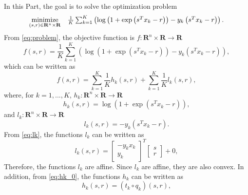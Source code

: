 \documentclass[12pt]{article}
\begin{document}
In this Part, the goal is to solve the optimization problem
\begin{equation} \label{eq:problem}
    \begin{array}[t]{ll} 
        \underset{(s,r) \in \mathbf{R}^n \times \mathbf{R}}{\text{minimize}} & \frac{1}{K} \sum_{k=1}^{K} \left(\log \left (1+\exp \left (s^T x_k - r\right) \right) - y_k \left (s^T x_k - r\right)  \right).\\
    \end{array} 
\end{equation}
From \eqref{eq:problem}, the objective function is $f: {\mathbf R}^n \times {\mathbf R} \rightarrow {\mathbf R}$
\begin{equation} \label{eq:objective_function_task_1}
    f(s,r) = \frac{1}{K} \sum_{k=1}^{K} \left(\log \left (1+\exp \left (s^T x_k - r\right) \right) - y_k \left (s^T x_k - r\right)  \right),
\end{equation}
which can be written as
\begin{equation} \label{eq:hk_lk_decomposition}
    f(s,r) = \sum_{k=1}^{K} \frac{1}{K} h_k(s,r) + \sum_{k=1}^{K} \frac{1}{K} l_k(s,r),
\end{equation}
where, for $k=1,...,K$, $h_k:{\mathbf R}^n \times {\mathbf R} \rightarrow {\mathbf R}$
\begin{equation} \label{eq:hk_0}
    h_k(s,r)=\log \left(1+\exp \left(s^T x_k - r\right)\right),
\end{equation}
and $l_k:{\mathbf R}^n \times {\mathbf R} \rightarrow {\mathbf R}$
\begin{equation} \label{eq:lk}
    l_k(s,r)=-y_k \left (s^T x_k - r\right).
\end{equation}
From \eqref{eq:lk}, the functions $l_k$ can be written as
\begin{equation}
    l_k(s,r) = \begin{bmatrix}
        -y_k x_k \\
        y_k
    \end{bmatrix}^T
    \begin{bmatrix}
        s \\
        r
    \end{bmatrix} + 0,
\end{equation}
Therefore, the functions $l_k$ are affine. Since $l_k$ are affine, they are also convex. In addition, from \eqref{eq:hk_0}, the functions $h_k$ can be written as
\begin{equation} \label{eq:hk}
    h_k(s,r) = \left (t_k \circ q_k \right) (s,r),
\end{equation}
\end{document}
